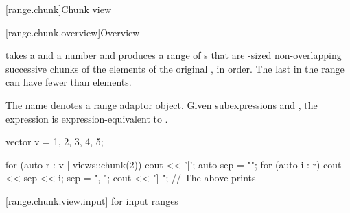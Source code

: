 [range.chunk]{Chunk view}

[range.chunk.overview]{Overview}

\pnum
{} takes a  and a number  and
produces a range of s
that are -sized non-overlapping successive chunks of
the elements of the original , in order.
The last  in the range can have fewer than  elements.

\pnum
{}%
The name  denotes
a range adaptor object.
Given subexpressions  and ,
the expression  is expression-equivalent to
.

\begin{example}
\begin{codeblock}
vector v = {1, 2, 3, 4, 5};

for (auto r : v | views::chunk(2)) {
  cout << '[';
  auto sep = "";
  for (auto i : r) {
    cout << sep << i;
    sep = ", ";
  }
  cout << "] ";
}
// The above prints \tcode{[1, 2] [3, 4] [5]}
\end{codeblock}
\end{example}

[range.chunk.view.input]{ for input ranges}

